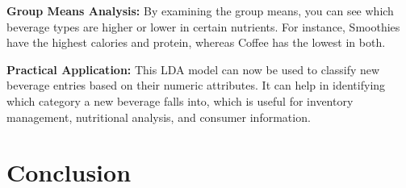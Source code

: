 \documentclass[
]{article}
\begin{document}
\textbf{Group Means Analysis:} By examining the group means, you can see
which beverage types are higher or lower in certain nutrients. For
instance, Smoothies have the highest calories and protein, whereas
Coffee has the lowest in both.

\textbf{Practical Application:} This LDA model can now be used to
classify new beverage entries based on their numeric attributes. It can
help in identifying which category a new beverage falls into, which is
useful for inventory management, nutritional analysis, and consumer
information.

\section{Conclusion}\label{conclusion}
\end{document}
